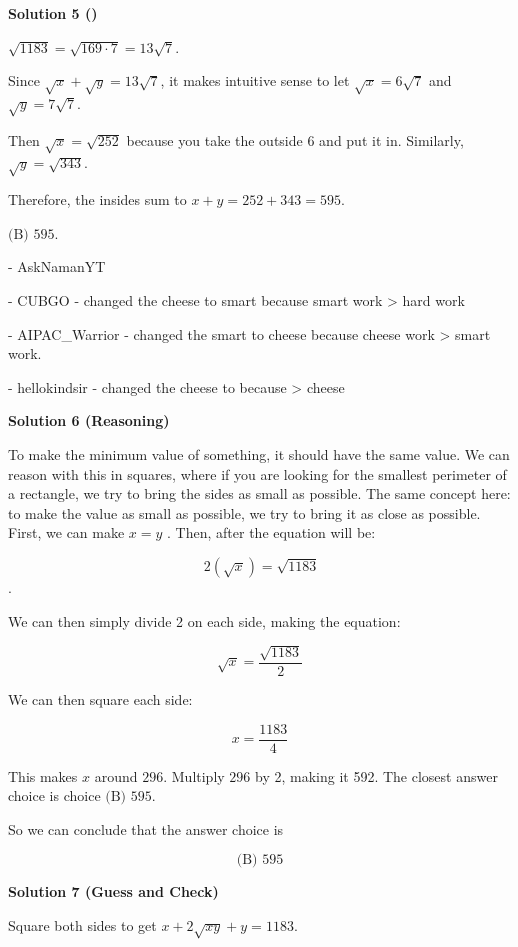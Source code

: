 \begin{enumerate}
 



\textbf{Solution 5 ()}

$\sqrt{1183}=\sqrt{169\cdot7}=13\sqrt7$.

 Since $\sqrt{x}+\sqrt{y}=13\sqrt7$, it makes intuitive sense to let $\sqrt{x}=6\sqrt7$ and $\sqrt{y}=7\sqrt7$.

 Then $\sqrt{x}=\sqrt{252}$ because you take the outside $6$ and put it in. Similarly, $\sqrt{y}=\sqrt{343}$.

 Therefore, the insides sum to $x+y=252+343=595$.

 $\boxed{\text{(B) 595}}$.

 - AskNamanYT

 - CUBGO - changed the cheese to smart because smart work > hard work

 - AIPAC\_Warrior - changed the smart to cheese because cheese work > smart work.

 - hellokindsir - changed the cheese to  because  > cheese

 



\textbf{Solution 6 (Reasoning)}

To make the minimum value of something, it should have the same value. We can reason with this in squares, where if you are looking for the smallest perimeter of a rectangle, we try to bring the sides as small as possible. The same concept here: to make the value as small as possible, we try to bring it as close as possible. First, we can make $x = y$ . Then, after the equation will be:

 
 \[\ 2(\sqrt {x}) = \sqrt{1183}\]. 

 We can then simply divide 2 on each side, making the equation:

 
 \[\sqrt{x} = \frac{\sqrt{1183}}{2}\]

 We can then square each side:

 
 \[x = \frac{1183}{4}\]

 This makes $x$ around $296$. Multiply $296$ by 2, making it 592. The closest answer choice is choice $\boxed{\text{(B) 595}}$. 

 So we can conclude that the answer choice is 

 
 \[\boxed{\text{(B) 595}}\]




\textbf{Solution 7 (Guess and Check)}

Square both sides to get $x + 2\sqrt{xy} + y = 1183$.


\end{enumerate}
